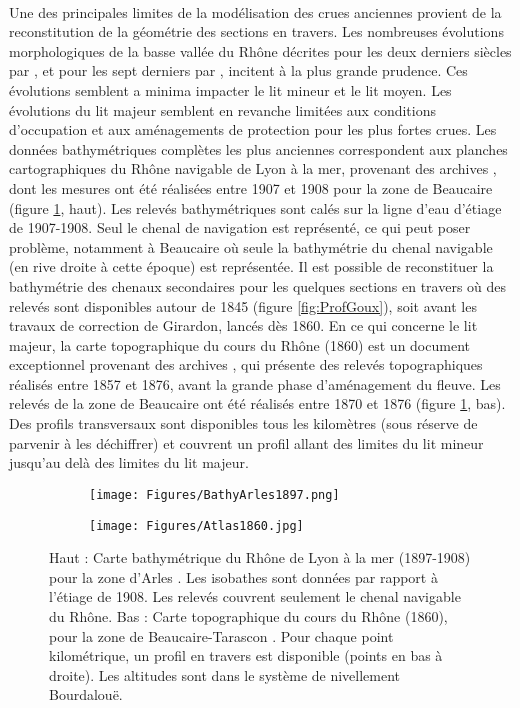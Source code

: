 \documentclass[11pt]{article}
\begin{document}
	\paragraph{} Une des principales limites de la modélisation des crues anciennes provient de la reconstitution de la géométrie des sections en travers. Les nombreuses évolutions morphologiques de la basse vallée du Rhône décrites pour les deux derniers siècles par \citet{raccasi_mutations_2008}, et pour les sept derniers	par \citet{pichard_sept_2014}, incitent à la plus grande prudence. Ces évolutions semblent a minima impacter le lit mineur et le lit moyen. Les évolutions du lit majeur semblent en revanche limitées aux conditions d'occupation et aux aménagements de protection pour les plus fortes crues. Les données bathymétriques complètes les plus anciennes correspondent aux planches cartographiques du Rhône navigable de Lyon à la mer, provenant des archives \citet{cnr_cartes_1908}, dont les mesures ont été réalisées entre 1907 et 1908 pour la zone de Beaucaire (figure \ref{fig:BathyTopo}, haut). Les relevés bathymétriques sont calés sur la ligne d'eau d'étiage de 1907-1908. Seul le chenal de navigation est représenté, ce qui peut poser problème, notamment à Beaucaire où seule la bathymétrie du chenal navigable (en rive droite à cette époque) est représentée. Il est possible de reconstituer la bathymétrie des chenaux secondaires pour les quelques sections en travers où des relevés sont disponibles autour de 1845 (figure \ref{fig:ProfGoux}), soit avant les travaux de correction de Girardon, lancés dès 1860. En ce qui concerne le lit majeur, la carte topographique du cours du Rhône (1860) est un document exceptionnel provenant des archives \citet{cnr_carte_1876}, qui présente des relevés topographiques réalisés entre 1857 et 1876, avant la grande phase d'aménagement du fleuve. Les relevés de la zone de Beaucaire ont été réalisés entre 1870 et 1876 (figure \ref{fig:BathyTopo}, bas). Des profils transversaux sont disponibles tous les kilomètres (sous réserve de parvenir à les déchiffrer) et couvrent un profil allant des limites du lit mineur jusqu'au delà des limites du lit majeur.
		
	\begin{figure}[h]
		\centering
		\begin{subfigure}{.7\linewidth}
			\texttt{[image: Figures/BathyArles1897.png]}
		\end{subfigure}
		\begin{subfigure}{0.7\linewidth}
			\texttt{[image: Figures/Atlas1860.jpg]}
		\end{subfigure}
		\caption{Haut : Carte bathymétrique du Rhône de Lyon à la mer (1897-1908) pour la zone d'Arles \citep{cnr_cartes_1908}. Les isobathes sont données par rapport à l'étiage de 1908. Les relevés couvrent seulement le chenal navigable du Rhône. Bas : Carte topographique du cours du Rhône (1860), pour la zone de Beaucaire-Tarascon \citep{cnr_carte_1876}. Pour chaque point kilométrique, un profil en travers est disponible (points en bas à droite). Les altitudes sont dans le système de nivellement Bourdalouë.}
		\label{fig:BathyTopo}
	\end{figure}
	
\end{document}
